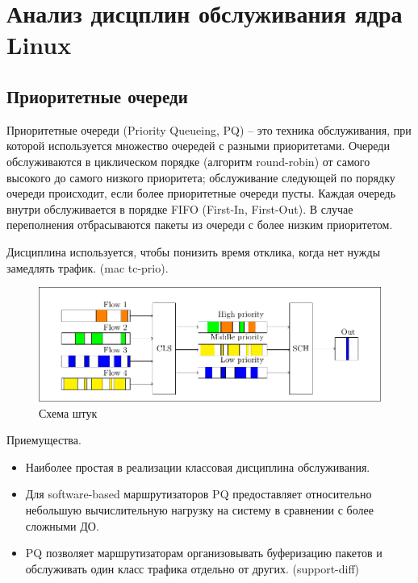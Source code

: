 \section{Анализ дисцплин обслуживания ядра Linux}

	\subsection{Приоритетные очереди}

    Приоритетные очереди (Priority Queueing, PQ) -- это техника обслуживания,
	при которой используется множество очередей с разными приоритетами. Очереди
	обслуживаются в циклическом порядке (алгоритм round-robin) от самого высокого 
	до самого низкого приоритета; обслуживание следующей по порядку очереди происходит,
	если более приоритетные очереди пусты. Каждая очередь внутри обслуживается в порядке FIFO
	(First-In, First-Out). В случае переполнения отбрасываются пакеты из очереди
	с более низким приоритетом. 
	
	Дисциплина используется, чтобы понизить время отклика, когда нет нужды замедлять трафик. (mac tc-prio).


	\begin{figure}[ht!]
    	\includegraphics{src/pdfimages/pq.pdf}
		\caption{Схема штук}
	\end{figure}


	Приемущества.
	\begin{itemize}
		\item Наиболее простая в реализации классовая дисциплина обслуживания.
		\item Для software-based маршрутизаторов PQ предоставляет относительно небольшую
             вычислительную нагрузку на систему в сравнении с более сложными ДО.
		\item PQ позволяет маршрутизаторам организовывать буферизацию пакетов и обслуживать
             один класс трафика отдельно от других. (support-diff)
	\end{itemize}

